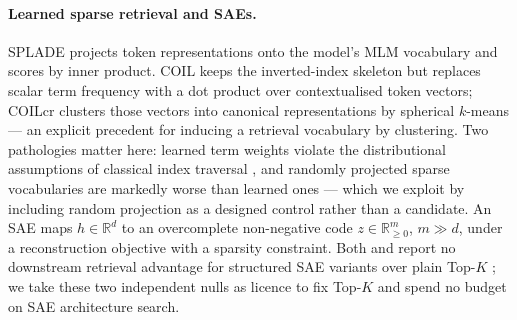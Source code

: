 \documentclass[11pt]{article}
\begin{document}
\paragraph{Learned sparse retrieval and SAEs.} SPLADE \citep{formal2021splade,lassance2024splade3} projects token representations onto the model's MLM vocabulary and scores by inner product. COIL \citep{gao2021coil} keeps the inverted-index skeleton but replaces scalar term frequency with a dot product over contextualised token vectors; COILcr \citep{fan2023coilcr} clusters those vectors into canonical representations by spherical $k$-means --- an explicit precedent for inducing a retrieval vocabulary by clustering. Two pathologies matter here: learned term weights violate the distributional assumptions of classical index traversal \citep{mackenzie2021wacky}, and randomly projected sparse vocabularies are markedly worse than learned ones \citep{zamani2018snrm,zong2026tokens} --- which we exploit by including random projection as a designed control rather than a candidate. An SAE maps $h\in\mathbb{R}^d$ to an overcomplete non-negative code $z\in\mathbb{R}^m_{\geq 0}$, $m\gg d$, under a reconstruction objective with a sparsity constraint. Both \citet{zong2026tokens} and \citet{clavie2026latent} report no downstream retrieval advantage for structured SAE variants over plain Top-$K$ \citep{gao2025scaling}; we take these two independent nulls as licence to fix Top-$K$ and spend no budget on SAE architecture search.
\end{document}
